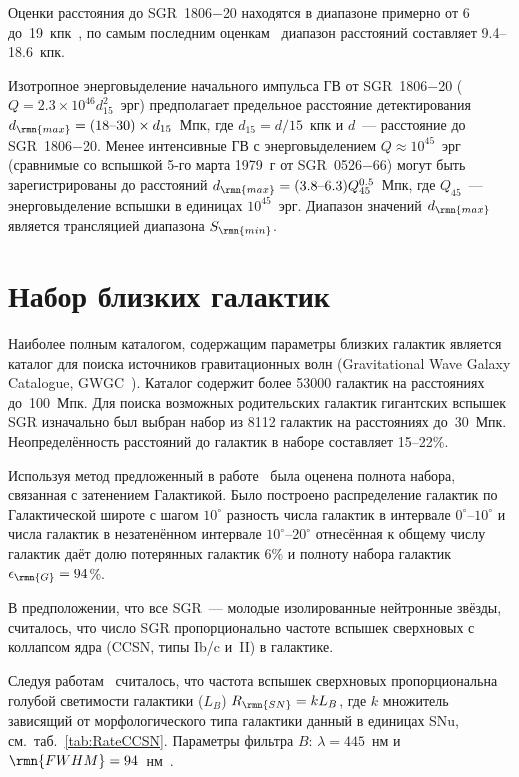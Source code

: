 Оценки расстояния до SGR~1806$-$20 находятся в диапазоне примерно от 6 
до~19~кпк~\citep{Tendulkar2012ApJ}, по самым последним оценкам~\citep{Svirski2011} 
диапазон расстояний составляет 9.4--18.6~кпк.

Изотропное энерговыделение начального импульса ГВ от SGR~1806$-$20 
($Q = 2.3\times 10^{46} d_{15}^2 $~эрг) предполагает предельное расстояние 
детектирования $d_{\rmn{max}} = (18\textrm{--}30)\times d_{15}$~Мпк, 
где $d_{15}=d/15$~кпк и $d$~--- расстояние до SGR~1806$-$20. 
Менее интенсивные ГВ с энерговыделением $Q \approx 10^{45}$~эрг 
(сравнимые со вспышкой 5-го марта 1979~г от SGR~0526$-$66) 
могут быть зарегистрированы до расстояний $d_{\rmn{max}} = (3.8\textrm{--}6.3) Q_{45}^{0.5}$~Мпк, 
где $Q_{45}$~--- энерговыделение вспышки в единицах $10^{45}$~эрг. 
Диапазон значений $d_{\rmn{max}}$ является трансляцией диапазона $S_{\rmn{min}}$.

\section{Набор близких галактик}\label{Gal_sample}
Наиболее полным каталогом, содержащим параметры близких галактик является 
каталог для поиска источников гравитационных волн (Gravitational Wave Galaxy Catalogue, 
GWGC~\citep{White2011CQGra}). Каталог содержит более 53000 галактик на расстояниях 
до~100~Мпк. Для поиска возможных родительских галактик гигантских вспышек SGR 
изначально был выбран набор из 8112 галактик на расстояниях до~30~Мпк. 
Неопределённость расстояний до галактик в наборе составляет 15--22\%.

Используя метод предложенный в работе~\citep{Ofek2007} была оценена полнота набора, 
связанная с затенением Галактикой. Было построено распределение галактик по Галактической 
широте с шагом $10^\circ$ разность числа галактик в интервале 
$0^\circ\textrm{--}10^\circ$ и числа галактик в незатенённом интервале 
$10^\circ\textrm{--}20^\circ$ отнесённая к общему числу галактик даёт долю 
потерянных галактик 6\% и полноту набора галактик $\epsilon_{\rmn{G}}=94$\%.

В предположении, что все SGR~--- молодые изолированные нейтронные звёзды, считалось, 
что число SGR пропорционально частоте вспышек сверхновых с коллапсом ядра 
(CCSN, типы Ib/c и~II) в галактике.

Следуя работам~\citep{Cappellaro1999, Boser2013} считалось, что частота вспышек 
сверхновых пропорциональна голубой светимости галактики ($L_{B}$) $R_{\rmn{SN}} = k L_{B}$, 
где $k$ множитель зависящий от морфологического типа галактики данный 
в единицах SNu, см.~таб.~\ref{tab:RateCCSN}. Параметры фильтра $B$: $\lambda=445$~нм 
и $\rmn{FWHM}=94$~нм~\citep{Binney1998GalAstr}.

